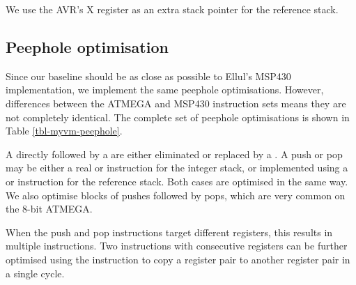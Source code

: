 We use the AVR's X register as an extra stack pointer for the reference stack.

\subsection{Peephole optimisation}
Since our baseline should be as close as possible to Ellul's MSP430 implementation, we implement the same peephole optimisations. However, differences between the ATMEGA and MSP430 instruction sets means they are not completely identical. The complete set of peephole optimisations is shown in Table \ref{tbl-myvm-peephole}.

A  directly followed by a  are either eliminated or replaced by a . A push or pop may be either a real  or  instruction for the integer stack, or implemented using a  or  instruction for the reference stack. Both cases are optimised in the same way. We also optimise blocks of pushes followed by pops, which are very common on the 8-bit ATMEGA. 

When the push and pop instructions target different registers, this results in multiple  instructions. Two  instructions with consecutive registers can be further optimised using the  instruction to copy a register pair to another register pair in a single cycle.


